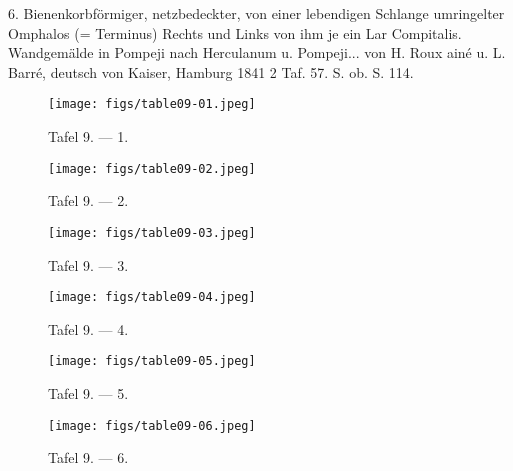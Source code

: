 \documentclass[a4paper, 11pt, oneside]{article}
\begin{document}
6. Bienenkorbförmiger, netzbedeckter, von einer lebendigen Schlange umringelter Omphalos (= Terminus) Rechts und Links von ihm je ein Lar Compitalis. Wandgemälde in Pompeji nach Herculanum u. Pompeji... von H. Roux ainé u. L. Barré, deutsch von Kaiser, Hamburg 1841 2 Taf. 57. S. ob. S. 114.
\clearpage
\vspace*{\fill}
\begin{figure}[H]
\centering
\texttt{[image: figs/table09-01.jpeg]}
\caption{\frakfamily Tafel 9. --- 1.}
\end{figure}
\vspace*{\fill}
\clearpage
\vspace*{\fill}
\begin{figure}[H]
\centering
\texttt{[image: figs/table09-02.jpeg]}
\caption{\frakfamily Tafel 9. --- 2.}
\end{figure}
\vspace*{\fill}
\clearpage
\vspace*{\fill}
\begin{figure}[H]
\centering
\texttt{[image: figs/table09-03.jpeg]}
\caption{\frakfamily Tafel 9. --- 3.}
\end{figure}
\vspace*{\fill}
\clearpage
\vspace*{\fill}
\begin{figure}[H]
\centering
\texttt{[image: figs/table09-04.jpeg]}
\caption{\frakfamily Tafel 9. --- 4.}
\end{figure}
\vspace*{\fill}
\clearpage
\vspace*{\fill}
\begin{figure}[H]
\centering
\texttt{[image: figs/table09-05.jpeg]}
\caption{\frakfamily Tafel 9. --- 5.}
\end{figure}
\vspace*{\fill}
\clearpage
\vspace*{\fill}
\begin{figure}[H]
\centering
\texttt{[image: figs/table09-06.jpeg]}
\caption{\frakfamily Tafel 9. --- 6.}
\end{figure}
\vspace*{\fill}
\clearpage
\end{document}
